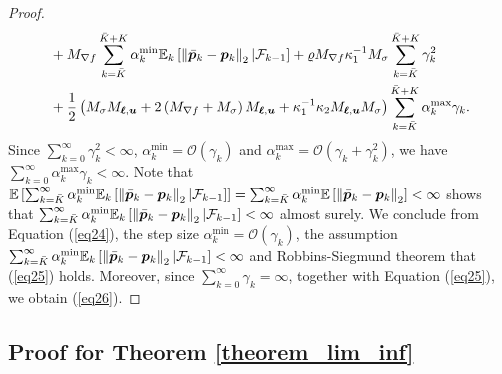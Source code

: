 \documentclass[aos]{imsart}
\numberwithin{equation}{section}
\theoremstyle{plain}
\begin{document}
\begin{appendix}
\begin{proof}
\begin{equation}
\begin{split}
            &  + M_{\nabla f} \sum_{k=\Bar{K}}^{\Bar{K} + K} \alpha_k^{\text{min}} \mathbb{E}_k \left[ \left\|\Bar{\bm{p}}_k - \bm{p}_k \right\|_2 | \mathcal{F}_{k-1} \right] + \varrho M_{\nabla f} \kappa_1^{-1} M_{\sigma} \sum_{k=\Bar{K}}^{\Bar{K} + K} \gamma_k^2 \\
            &  + \frac{1}{2} \left( M_{\sigma} M_{\bm{\ell},\bm{u}} + 2 \left(M_{\nabla f} + M_{\sigma} \right)  M_{\bm{\ell},\bm{u}} + \kappa_1^{-1} \kappa_2 M_{\bm{\ell},\bm{u}} M_{\sigma} \right) \sum_{k=\Bar{K}}^{\Bar{K} + K}  \alpha_k^{\text{max}} \gamma_k.
      \end{split}
    \end{equation} 
    Since $\sum_{k=0}^{\infty} \gamma_k^2 < \infty$, $\alpha_k^{\text{min}} = \mathcal{O}\left( \gamma_k \right)$ and  $\alpha_k^{\text{max}} = \mathcal{O}\left( \gamma_k + \gamma_k^2 \right)$, we have $\sum_{k=0}^{\infty} \alpha_k^{\text{max}} \gamma_k < \infty$. Note that $\mathbb{E} \left[\sum_{k=\Bar{K}}^{\infty} \alpha_k^{\text{min}} \mathbb{E}_k \left[\left\|\Bar{\bm{p}}_k - \bm{p}_k \right\|_2| \mathcal{F}_{k-1} \right]\right] = \sum_{k=\Bar{K}}^{\infty} \alpha_k^{\text{min}} \mathbb{E} \left[\left\|\Bar{\bm{p}}_k - \bm{p}_k \right\|_2\right] < \infty$ shows that $\sum_{k=\Bar{K}}^{\infty} \alpha_k^{\text{min}} \mathbb{E}_k \left[\left\|\Bar{\bm{p}}_k - \bm{p}_k \right\|_2| \mathcal{F}_{k-1} \right] < \infty$ almost surely. We conclude from Equation (\ref{eq24}), the step size $\alpha_k^{\text{min}} = \mathcal{O}\left( \gamma_k \right)$, the assumption $\sum_{k=\Bar{K}}^{\infty} \alpha_k^{\text{min}} \mathbb{E}_k \left[\left\|\Bar{\bm{p}}_k - \bm{p}_k \right\|_2| \mathcal{F}_{k-1} \right] < \infty$ and Robbins-Siegmund theorem \cite{robbins1971convergence} that (\ref{eq25}) holds. Moreover, since $\sum_{k=0}^{\infty} \gamma_k = \infty$, together with Equation (\ref{eq25}), we obtain (\ref{eq26}).
\end{proof}


\subsection{Proof for Theorem \ref{theorem_lim_inf}}


\end{appendix}
\end{document}
